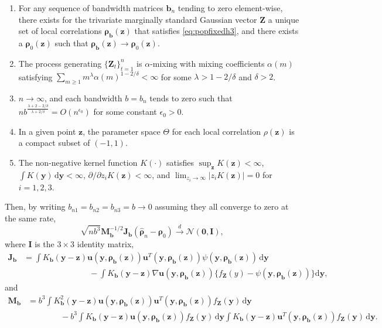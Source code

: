 \documentclass[
  12pt,
  letterpaper]{article}
\providecommand{\tightlist}{%
  \setlength{\itemsep}{0pt}\setlength{\parskip}{0pt}}
\newcommand{\Z}{\bm{Z}}
\newcommand{\z}{\bm{z}}
\newcommand{\y}{\bm{y}}
\newcommand{\fu}{\bm{u}}
\newcommand{\frho}{\bm{\rho}}
\newcommand{\hfrho}{\widehat{\bm{\rho}}}
\newcommand{\hh}{\bm{b}}
\newcommand{\Jb}{\bm{J}_{\hh}}
\newcommand{\Mb}{\bm{M}_{\hh}}
\theoremstyle{definition}
\theoremstyle{definition}
\theoremstyle{definition}
\theoremstyle{remark}
\begin{document}
\begin{enumerate}
\def\labelenumi{\arabic{enumi}.}
\tightlist
\item
  For any sequence of bandwidth matrices \(\hh_n\) tending to zero element-wise, there exists for the trivariate marginally standard Gaussian vector \(\Z\) a unique set of local correlations \(\frho_{\hh}(\z)\) that satisfies \eqref{eq:popfixedh3}, and there exists a \(\frho_0(\z)\) such that \(\frho_{\hh}(\z) \rightarrow \frho_0(\z)\).
\item
  The process generating \(\{\Z_t\}_{t=1}^n\) is \(\alpha\)-mixing with mixing coefficients \(\alpha(m)\) satisfying \(\sum_{m\geq1}m^{\lambda}\alpha(m)^{1-2/\delta} < \infty\) for some \(\lambda > 1-2/\delta\) and \(\delta>2\).
\item
  \(n\rightarrow\infty\), and each bandwidth \(b = b_n\) tends to zero such that \(nb^{\frac{\lambda+2-2/\delta}{\lambda + 2/\delta}} = O(n^{\epsilon_0})\) for some constant \(\epsilon_0 > 0\).
\item
  In a given point \(\z\), the parameter space \(\Theta\) for each local correlation \(\rho(\z)\) is a compact subset of \((-1,1)\).
\item
  The non-negative kernel function \(K(\cdot)\) satisfies \(\sup_{\z}K(\z) < \infty\), \(\int K(\y)\,\textrm{d}\y < \infty\), \(\partial/\partial z_iK(\z) <\infty\), and \(\lim_{z_i \rightarrow \infty}|z_iK(\z)| = 0\) for \(i = 1,2,3\).
\end{enumerate}

Then, by writing \(b_{n1} = b_{n2} = b_{n3} = b \rightarrow 0\) assuming they all converge to zero at the same rate,
\begin{equation}
\sqrt{nb^3}\Mb^{-1/2}\Jb\left(\hfrho_n - \frho_0\right) \stackrel{d}{\rightarrow} \mathcal{N}(\bm{0}, \bm{I}),
\label{eq:an3}
\end{equation}
where \(\bm{I}\) is the \(3\times3\) identity matrix,
\begin{align*}
\Jb &= \int K_{\hh}(\y - \z)\fu(\y, \frho_{\hh}(\z))\fu^T(\y, \frho_{\hh}(\z))\psi(\y,\frho_{\hh}(\z))\,\textrm{d}\y \\
& \qquad\qquad\qquad\qquad - \int K_{\hh}(\y - \z)\nabla\fu(\y,\frho_{\hh}(\z))\Big\{f_{\Z}(y) - \psi(\y,\frho_{\hh}(\z))\Big\}\textrm{d}\y,
\end{align*}
and
\begin{align*}
\Mb &= b^3\int K^2_{\hh}(\y - \z)\fu(\y, \frho_{\hh}(\z))\fu^T(\y,\frho_{\hh}(\z))f_{\Z}(\y)\,\textrm{d}\y \\
& \qquad\qquad - b^3\int K_{\hh}(\y - \z)\fu(\y, \frho_{\hh}(\z))f_{\Z}(\y)\,\textrm{d}\y \int K_{\hh}(\y - \z)\fu^T(\y, \frho_{\hh}(\z))f_{\Z}(\y)\,\textrm{d}\y.
\end{align*}
\end{document}
